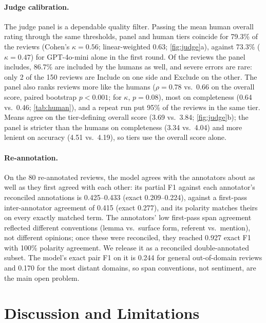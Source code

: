 \documentclass[runningheads]{llncs}
\begin{document}
\paragraph{Judge calibration.} The judge panel is a dependable quality filter. Passing the mean human overall rating through the same thresholds, panel and human tiers coincide for 79.3\% of the reviews (Cohen's $\kappa{=}0.56$; linear-weighted 0.63; \cref{fig:judge}a), against 73.3\% ($\kappa{=}0.47$) for GPT-4o-mini alone in the first round. Of the reviews the panel includes, 86.7\% are included by the humans as well, and severe errors are rare: only 2 of the 150 reviews are Include on one side and Exclude on the other. The panel also ranks reviews more like the humans ($\rho{=}0.78$ vs.\ 0.66 on the overall score, paired bootstrap $p{<}0.001$; for $\kappa$, $p{=}0.08$), most on completeness (0.64 vs.\ 0.46; \cref{tab:human}), and a repeat run put 95\% of the reviews in the same tier. Means agree on the tier-defining overall score (3.69 vs.\ 3.84; \cref{fig:judge}b); the panel is stricter than the humans on completeness (3.34 vs.\ 4.04) and more lenient on accuracy (4.51 vs.\ 4.19), so tiers use the overall score alone.

\paragraph{Re-annotation.} On the 80 re-annotated reviews, the model agrees with the annotators about as well as they first agreed with each other: its partial F1 against each annotator's reconciled annotations is 0.425--0.433 (exact 0.209--0.224), against a first-pass inter-annotator agreement of 0.415 (exact 0.277), and its polarity matches theirs on every exactly matched term. The annotators' low first-pass span agreement reflected different conventions (lemma vs.\ surface form, referent vs.\ mention), not different opinions; once these were reconciled, they reached 0.927 exact F1 with 100\% polarity agreement. We release it as a reconciled double-annotated subset. The model's exact pair F1 on it is 0.244 for general out-of-domain reviews and 0.170 for the most distant domains, so span conventions, not sentiment, are the main open problem.

\section{Discussion and Limitations}
\label{sec:discussion}
\end{document}
